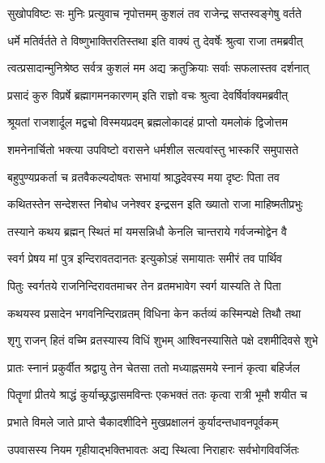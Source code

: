 \twolineshloka
{सुखोपविष्टः सः मुनिः प्रत्युवाच नृपोत्तमम्}
{कुशलं तव राजेन्द्र सप्तस्वङ्गेषु वर्तते} %

\twolineshloka
{धर्मे मतिर्वर्तते ते विष्णुभाक्तिरतिस्तथा}
{इति वाक्यं तु देवर्षेः श्रुत्वा राजा तमब्रवीत्} %


\twolineshloka
{त्वत्प्रसादान्मुनिश्रेष्ठ सर्वत्र कुशलं मम}
{अद्य क्रतुक्रियाः सर्वाः सफलास्तव दर्शनात्} %

\twolineshloka
{प्रसादं कुरु विप्रर्षे ब्रह्मागमनकारणम्}
{इति राज्ञो वचः श्रुत्वा देवर्षिर्वाक्यमब्रवीत्} %


\twolineshloka
{श्रूयतां राजशार्दूल मद्वचो विस्मयप्रदम्}
{ब्रह्मलोकादहं प्राप्तो यमलोकं द्विजोत्तम} %

\twolineshloka
{शमनेनार्चितो भक्त्या उपविष्टो वरासने}
{धर्मशील सत्यवांस्तु भास्करिं समुपासते} %

\twolineshloka
{बहुपुण्यप्रकर्ता च व्रतवैकल्यदोषतः}
{सभायां श्राद्धदेवस्य मया दृष्टः पिता तव} %

\twolineshloka
{कथितस्तेन सन्देशस्त निबोध जनेश्वर}
{इन्द्रसन इति ख्यातो राजा माहिष्मतीप्रभुः} %

\twolineshloka
{तस्याने कथय ब्रह्मन् स्थितं मां यमसन्निधौ}
{केनलि चान्तराये गर्वजन्मोद्वेन वै} %

\twolineshloka
{स्वर्ग प्रेषय मां पुत्र इन्दिरावतदानतः}
{इत्युकोऽहं समायातः समीरं तव पार्थिव} %

\twolineshloka
{पितुः स्वर्गतये राजनिन्दिरावतमाचर}
{तेन व्रतमभावेग स्वर्ग यास्यति ते पिता} %


\twolineshloka
{कथयस्व प्रसादेन भगवनिन्दिराव्रतम्}
{विधिना केन कर्तव्यं कस्मिन्पक्षे तिथौ तथा} %


\twolineshloka
{शृगु राजन् हितं वच्मि व्रतस्यास्य विधिं शुभम्}
{आश्विनस्यासिते पक्षे दशमीदिवसे शुभे} %

\twolineshloka
{प्रातः स्नानं प्रकुर्वीत श्रद्वायु तेन चेतसा}
{ततो मध्याह्नसमये स्नानं कृत्वा बहिर्जल} %

\twolineshloka
{पितॄणां प्रीतये श्राद्धं कुर्याच्छ्रद्धासमविन्तः}
{एकभक्तं ततः कृत्वा रात्री भूमौ शयीत च} %

\twolineshloka
{प्रभाते विमले जाते प्राप्ते चैकादशीदिने}
{मुखप्रक्षालनं कुर्यादन्तधावनपूर्वकम्} %

\twolineshloka
{उपवासस्य नियम गृहीयाद्भक्तिभावतः}
{अद्य स्थित्वा निराहारः सर्वभोगविवर्जितः} %

